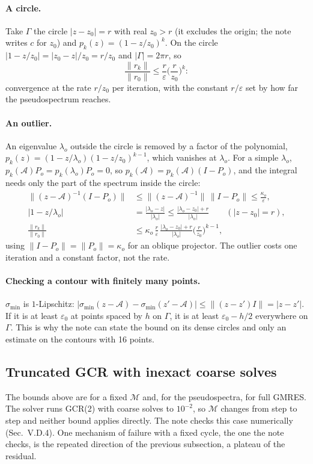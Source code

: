 \documentclass[11pt,a4paper]{article}
\numberwithin{equation}{section}
\begin{document}
\paragraph{A circle.} Take $\Gamma$ the circle $|z-z_0|=r$ with real $z_0>r$ (it excludes the origin; the note writes $c$
for $z_0$) and $p_k(z)=(1-z/z_0)^k$. On the circle $|1-z/z_0|=|z_0-z|/z_0=r/z_0$ and
$|\Gamma|=2\pi r$, so
\begin{equation}
\frac{\|r_k\|}{\|r_0\|}\le\frac r\varepsilon\Big(\frac r{z_0}\Big)^k :
\end{equation}
convergence at the rate $r/z_0$ per iteration, with the constant $r/\varepsilon$ set by how far the
pseudospectrum reaches.

\paragraph{An outlier.} An eigenvalue $\lambda_o$ outside the circle is removed by a factor of the
polynomial, $p_k(z)=(1-z/\lambda_o)(1-z/z_0)^{k-1}$, which vanishes at $\lambda_o$. For a simple
$\lambda_o$,
$p_k(\mathcal A)P_o=p_k(\lambda_o)P_o=0$, so $p_k(\mathcal A)=p_k(\mathcal A)(I-P_o)$, and the
integral needs only the part of the spectrum inside the circle:
\begin{align}
\|(z-\mathcal A)^{-1}(I-P_o)\|&\le\|(z-\mathcal A)^{-1}\|\,\|I-P_o\|\le\frac{\kappa_o}{\varepsilon},\nonumber\\
|1-z/\lambda_o|&=\frac{|\lambda_o-z|}{|\lambda_o|}\le\frac{|\lambda_o-z_0|+r}{|\lambda_o|}\qquad(|z-z_0|=r),\nonumber\\
\frac{\|r_k\|}{\|r_0\|}&\le\kappa_o\,\frac r\varepsilon\,\frac{|\lambda_o-z_0|+r}{|\lambda_o|}\Big(\frac r{z_0}\Big)^{k-1},
\end{align}
using $\|I-P_o\|=\|P_o\|=\kappa_o$ for an oblique projector. The outlier costs one iteration and a
constant factor, not the rate.

\paragraph{Checking a contour with finitely many points.} $\sigma_{\min}$ is $1$-Lipschitz:
$|\sigma_{\min}(z-\mathcal A)-\sigma_{\min}(z'-\mathcal A)|\le\|(z-z')I\|=|z-z'|$. If it is at least
$\varepsilon_0$ at points spaced by $h$ on $\Gamma$, it is at least $\varepsilon_0-h/2$ everywhere on
$\Gamma$. This is why the note can state the bound on its dense circles and only an estimate on the
contours with 16 points.

\subsection{Truncated GCR with inexact coarse solves}
The bounds above are for a fixed $\mathcal M$ and, for the pseudospectra, for full GMRES. The
solver runs GCR(2) with coarse solves to $10^{-2}$, so $\mathcal M$ changes from step to step and
neither bound applies directly. The note checks this case numerically (Sec.~V.D.4). One mechanism
of failure with a fixed cycle, the one the note checks, is the repeated direction of the previous
subsection, a plateau of the residual.
\end{document}
